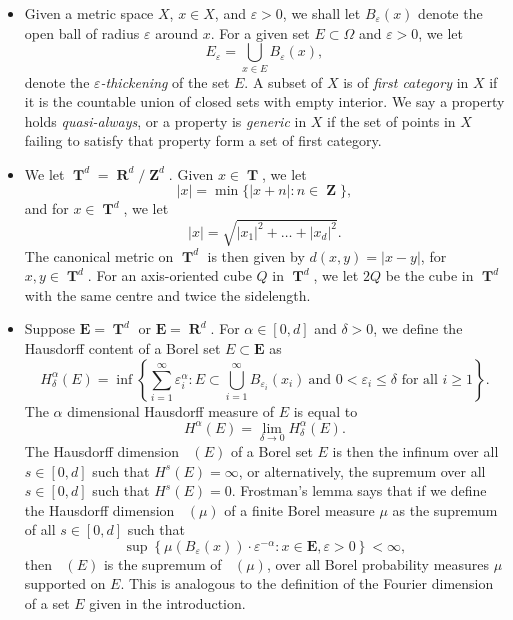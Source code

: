 \documentclass[12pt,reqno]{article}
\numberwithin{equation}{section}
\DeclareMathOperator{\hausdim}{\dim_{\mathbf{H}}}
\DeclareMathOperator{\RR}{\mathbf{R}}
\DeclareMathOperator{\ZZ}{\mathbf{Z}}
\DeclareMathOperator{\TT}{\mathbf{T}}
\numberwithin{theorem}{section}
\begin{document}
\begin{itemize}

    \item Given a metric space $X$, $x \in X$, and $\varepsilon > 0$, we shall let $B_\varepsilon(x)$ denote the open ball of radius $\varepsilon$ around $x$. For a given set $E \subset \Omega$ and $\varepsilon > 0$, we let
    \[ E_\varepsilon = \bigcup_{x \in E} B_\varepsilon(x), \]
    denote the \emph{$\varepsilon$-thickening} of the set $E$. A subset of $X$ is of \emph{first category} in $X$ if it is the countable union of closed sets with empty interior. We say a property holds \emph{quasi-always}, or a property is \emph{generic} in $X$ if the set of points in $X$ failing to satisfy that property form a set of first category.

    \item We let $\TT^d = \RR^d/\ZZ^d$. Given $x \in \TT$, we let
    \[ |x| = \min \{ |x + n| : n \in \ZZ \}, \]
    and for $x \in \TT^d$, we let
    \[ |x| = \sqrt{|x_1|^2 + \dots + |x_d|^2}. \]
    The canonical metric on $\TT^d$ is then given by $d(x,y) = |x - y|$, for $x,y \in \TT^d$. For an axis-oriented cube $Q$ in $\TT^d$, we let $2Q$ be the cube in $\TT^d$ with the same centre and twice the sidelength.

    \item Suppose $\mathbf{E} = \TT^d$ or $\mathbf{E} = \RR^d$. For $\alpha \in [0,d]$ and $\delta > 0$, we define the Hausdorff content of a Borel set $E \subset \mathbf{E}$ as
    \[ H^\alpha_\delta(E) = \inf \left\{ \sum_{i = 1}^\infty \varepsilon_i^\alpha : E \subset \bigcup_{i = 1}^\infty B_{\varepsilon_i}(x_i)\ \text{and $0 < \varepsilon_i \leq \delta$ for all $i \geq 1$} \right\}. \]
    The $\alpha$ dimensional Hausdorff measure of $E$ is equal to
    \[ H^\alpha(E) = \lim_{\delta \to 0} H^\alpha_\delta(E). \]
    The Hausdorff dimension $\hausdim(E)$ of a Borel set $E$ is then the infinum over all $s \in [0,d]$ such that $H^s(E) = \infty$, or alternatively, the supremum over all $s \in [0,d]$ such that $H^s(E) = 0$. Frostman's lemma says that if we define the Hausdorff dimension $\hausdim(\mu)$ of a finite Borel measure $\mu$ as the supremum of all $s \in [0,d]$ such that
    \begin{equation} \label{hausdim}
        \sup \left\{ \mu(B_\varepsilon(x)) \cdot \varepsilon^{-\alpha} : x \in \mathbf{E}, \varepsilon > 0 \right\} < \infty,
    \end{equation}
    then $\hausdim(E)$ is the supremum of $\hausdim(\mu)$, over all Borel probability measures $\mu$ supported on $E$. This is analogous to the definition of the Fourier dimension of a set $E$ given in the introduction.


\end{itemize}
\end{document}
